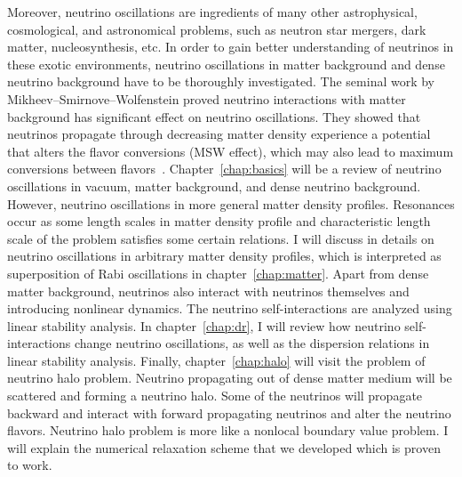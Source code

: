 Moreover, neutrino oscillations are ingredients of many other astrophysical, cosmological, and astronomical problems, such as neutron star mergers, dark matter, nucleosynthesis, etc. In order to gain better understanding of neutrinos in these exotic environments, neutrino oscillations in matter background and dense neutrino background have to be thoroughly investigated. The seminal work by Mikheev--Smirnove--Wolfenstein proved neutrino interactions with matter background has significant effect on neutrino oscillations. They showed that neutrinos propagate through decreasing matter density experience a potential that alters the flavor conversions (MSW effect), which may also lead to maximum conversions between flavors~\cite{Mikheev:1986gs,wolf78,wolfensteinprd1979}. Chapter~\ref{chap:basics} will be a review of neutrino oscillations in vacuum, matter background, and dense neutrino background. However, neutrino oscillations in more general matter density profiles. Resonances occur as some length scales in matter density profile and characteristic length scale of the problem satisfies some certain relations. I will discuss in details on neutrino oscillations in arbitrary matter density profiles, which is interpreted as superposition of Rabi oscillations in chapter~\ref{chap:matter}. Apart from dense matter background, neutrinos also interact with neutrinos themselves and introducing nonlinear dynamics. The neutrino self-interactions are analyzed using linear stability analysis. In chapter~\ref{chap:dr}, I will review how neutrino self-interactions change neutrino oscillations, as well as the dispersion relations in linear stability analysis. Finally, chapter~\ref{chap:halo} will visit the problem of neutrino halo problem. Neutrino propagating out of dense matter medium will be scattered and forming a neutrino halo. Some of the neutrinos will propagate backward and interact with forward propagating neutrinos and alter the neutrino flavors. Neutrino halo problem is more like a nonlocal boundary value problem. I will explain the numerical relaxation scheme that we developed which is proven to work.


